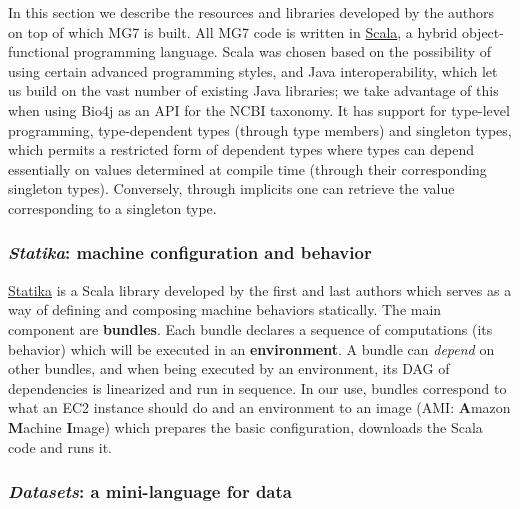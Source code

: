 \documentclass{frontiersSCNS} %
\begin{document}
In this section we describe the resources and libraries developed by the
authors on top of which MG7 is built. All MG7 code is written in
\href{http://www.scala-lang.org/}{Scala}, a hybrid object-functional
programming language. Scala was chosen based on the possibility of using
certain advanced programming styles, and Java interoperability, which
let us build on the vast number of existing Java libraries; we take
advantage of this when using Bio4j as an API for the NCBI taxonomy. It
has support for type-level programming, type-dependent types (through
type members) and singleton types, which permits a restricted form of
dependent types where types can depend essentially on values determined
at compile time (through their corresponding singleton types).
Conversely, through implicits one can retrieve the value corresponding
to a singleton type.

\subsubsection{\texorpdfstring{\emph{Statika}: machine configuration and
behavior}{Statika: machine configuration and behavior}}\label{statika-machine-configuration-and-behavior}

\href{https://github.com/ohnosequences/statika}{Statika} is a Scala
library developed by the first and last authors which serves as a way of
defining and composing machine behaviors statically. The main component
are \textbf{bundles}. Each bundle declares a sequence of computations
(its behavior) which will be executed in an \textbf{environment}. A
bundle can \emph{depend} on other bundles, and when being executed by an
environment, its DAG of dependencies is linearized and run in sequence.
In our use, bundles correspond to what an EC2 instance should do and an
environment to an image (AMI: \textbf{A}mazon \textbf{M}achine
\textbf{I}mage) which prepares the basic configuration, downloads the
Scala code and runs it.

\subsubsection{\texorpdfstring{\emph{Datasets}: a mini-language for
data}{Datasets: a mini-language for data}}\label{datasets-a-mini-language-for-data}
\end{document}
